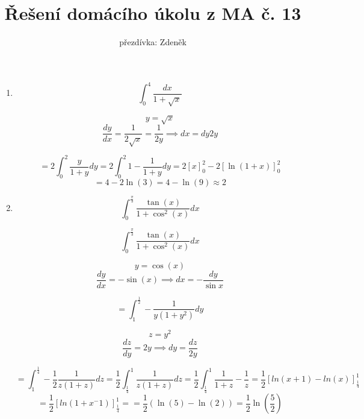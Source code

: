 \documentclass[10pt,a4paper]{article}
\title{Řešení domácího úkolu z MA č. 13}
\author{přezdívka: Zdeněk}
\date{}
\theoremstyle{plain}
\theoremstyle{definition}
\begin{document}
\maketitle

\section{}


\begin{enumerate}[label=(\alph*)]

\item 

\[ \int_0^4 \frac{dx}{1+\sqrt{x}} \]

\[ y = \sqrt{x}\]
\[ \frac{dy}{dx} =\frac{1}{2\sqrt{x}} = \frac1{2y} \implies dx =  dy 2y \]

\[ = 2 \int_0^2 \frac{y}{1+y} dy = 2 \int_0^2 1 - \frac{1}{1+y} dy  = 2 [x]_0^2 - 2[\ln(1+x)]_0^2 \]
\[ = 4 - 2 \ln(3) = 4 - \ln(9) \approx 2\]

\item

\[ \int_0^{\frac{\pi}{3}} \frac{\tan(x) }{1 + \cos^2(x) } dx  \]


\[
\int_0^{\frac{\pi}{3}} \frac{\tan(x) }{1 + \cos^2(x)} dx
\]

\[ y = \cos(x) \]
\[ \frac{dy}{dx} = - \sin(x) \implies dx = -\frac{dy}{\sin x}\]

\[
= \int_1^{\frac12} - \frac{1}{y(1 + y^2)} dy
\]

\[ z = y^2 \]
\[\frac{dz}{dy} = 2y \implies dy = \frac{dz}{2y}  \]


\[
= \int_1^{\frac14} - \frac12 \frac{1}{z(1 + z)} dz
= \frac12 \int_{\frac14}^1  \frac{1}{z(1 + z)} dz
= \frac12 \int_{\frac14}^1  \frac{1}{1 + z} - \frac{1}{z} 
= \frac12 [ln(x+1) - ln(x)]_{\frac14}^1 \]\[
=\frac12 [ln(1+x^-1)]_{\frac14}^1 
= = \frac12 \left( \ln(5) - \ln(2) \right) = \frac12 \ln\left( \frac52 \right)
\]

\section{}



\end{enumerate}
\end{document}
